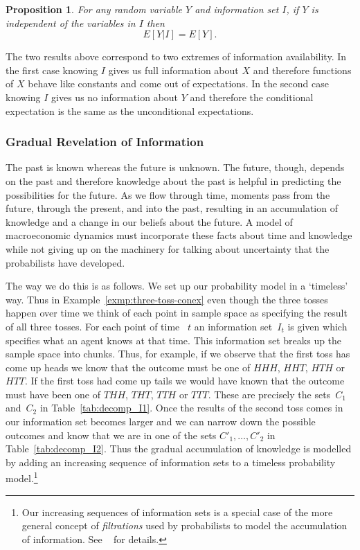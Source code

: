 \documentclass[11pt,reqno,openany]{amsbook}
\theoremstyle{plain}
\newtheorem{prop}{Proposition}[chapter]
\theoremstyle{definition}
\newcommand{\newterm}[1]{\emph{#1}}
\begin{document}
\begin{prop}\label{prop:conex-ind}
For any random variable $Y$ and information set $I$, if $Y$ is
  independent of the variables in $I$ then
  \[E[Y|I]=E[Y].\]
\end{prop}

The two results above correspond to two extremes of information
availability. In the first case knowing $I$ gives us full information
about $X$ and therefore functions of $X$ behave like constants and
come out of expectations. In the second case knowing $I$ gives us no
information about $Y$ and therefore the conditional expectation is
the same as the unconditional expectations.

\subsubsection{Gradual Revelation of Information}
The past is known whereas the future is unknown. The future, though,
depends on the past and therefore knowledge about the past is helpful
in predicting the possibilities for the future. As we flow through
time, moments pass from the future, through the present, and into the
past, resulting in an accumulation of knowledge and a change in our
beliefs about the future. A model of macroeconomic dynamics must
incorporate these facts about time and knowledge while not giving up
on the machinery for talking about uncertainty that the
probabilists have developed. 

The way we do this is as follows. We set up our probability model in a
`timeless' way. Thus in Example~\ref{exmp:three-toss-conex} even
though the three tosses happen over time we think of each point in
sample space as specifying the result of all three tosses. For each
point of time~ $t$ an information set~$I_t$ is given which specifies
what an agent knows at that time. This information set breaks up the
sample space into chunks. Thus, for example, if we observe that the
first toss has come up heads we know that the outcome must be one of
$HHH$, $HHT$, $HTH$ or $HTT$. If the first toss had come up tails we
would have known that the outcome must have been one of $THH$, $THT$,
$TTH$ or $TTT$. These are precisely the sets~$C_1$ and~$C_2$ in
Table~\ref{tab:decomp_I1}. Once the results of the second toss comes
in our information set becomes larger and we can narrow down the
possible outcomes and know that we are in one of the sets
$C'_1,\ldots,C'_2$ in Table~\ref{tab:decomp_I2}. Thus the gradual
accumulation of knowledge is modelled by adding an increasing sequence
of information sets to a timeless probability model.\footnote{Our increasing
  sequences of information sets is a special case of the more general
  concept of \newterm{filtrations} used by probabilists to model the
  accumulation of information. See ~\cite{billingsley-prob-measure} for details.} 
\end{document}
